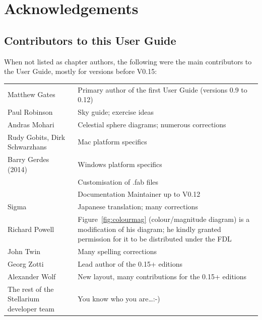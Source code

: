 \chapter{Acknowledgements}
\begingroup\small %
\section{Contributors to this User Guide}
\label{sec:Contributors}
When not listed as chapter authors, the following were the main contributors to the User Guide, mostly for versions before V0.15:

\noindent%
\begin{tabularx}{\textwidth}{l|X}
\toprule
Matthew Gates  & Primary author of the first User Guide (versions 0.9 to 0.12)\\
Paul Robinson  &Sky guide; exercise ideas\\
Andras Mohari  &Celestial sphere diagrams; numerous corrections\\
Rudy Gobits, Dirk Schwarzhans & Mac platform specifics\\
Barry Gerdes (\textdagger{}2014)  &Windows platform specifics \\
               &Customisation of .fab files\\
               &Documentation Maintainer up to V0.12\\
Sigma          &Japanese translation; many corrections\\ %
Richard Powell & Figure~\ref{fig:colourmag} (colour/magnitude diagram) is a modification of his diagram; 
                 he kindly granted permission for it to be distributed under the FDL\\
John Twin      & Many spelling corrections \\\midrule
Georg Zotti    & Lead author of the 0.15+ editions\\
Alexander Wolf & New layout, many contributions for the 0.15+ editions\\
The rest of the Stellarium developer team & You know who you are\ldots :-)\tabularnewline
\bottomrule
\end{tabularx}


